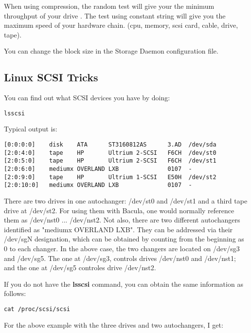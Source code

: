 When using compression, the random test will give your the minimum throughput
of your drive . The test using constant string will give you the maximum speed
of your hardware chain. (cpu, memory, scsi card, cable, drive, tape).

You can change the block size in the Storage Daemon configuration file.

\label{SCSITricks}
\subsection{Linux SCSI Tricks}

You can find out what SCSI devices you have by doing:

\footnotesize
\begin{verbatim}
lsscsi
\end{verbatim}
\normalsize

Typical output is:

\footnotesize
\begin{verbatim}
[0:0:0:0]    disk    ATA      ST3160812AS      3.AD  /dev/sda
[2:0:4:0]    tape    HP       Ultrium 2-SCSI   F6CH  /dev/st0
[2:0:5:0]    tape    HP       Ultrium 2-SCSI   F6CH  /dev/st1
[2:0:6:0]    mediumx OVERLAND LXB              0107  -
[2:0:9:0]    tape    HP       Ultrium 1-SCSI   E50H  /dev/st2
[2:0:10:0]   mediumx OVERLAND LXB              0107  -
\end{verbatim}
\normalsize

There are two drives in one autochanger: /dev/st0 and /dev/st1
and a third tape drive at /dev/st2.  For using them with Bacula, one
would normally reference them as /dev/nst0 ... /dev/nst2.  Not also,
there are two different autochangers identified as "mediumx OVERLAND LXB".
They can be addressed via their /dev/sgN designation, which can be
obtained by counting from the beginning as 0 to each changer.  In the
above case, the two changers are located on /dev/sg3 and /dev/sg5. The one
at /dev/sg3, controls drives /dev/nst0 and /dev/nst1; and the one at
/dev/sg5 controles drive /dev/nst2.

If you do not have the {\bf lsscsi}  command, you can obtain the same
information as follows:

\footnotesize
\begin{verbatim}
cat /proc/scsi/scsi
\end{verbatim}
\normalsize

For the above example with the three drives and two autochangers,
I get:

